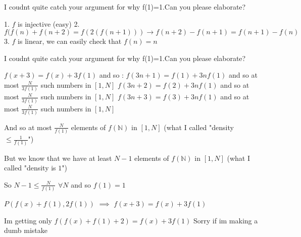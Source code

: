 \begin{solution}
	I coudnt quite catch your argument for why f(1)=1.Can you please elaborate?
\end{solution}



\begin{solution}
	1. $f$ is injective (easy)
2. $f(f(n)+f(n+2)=f(2(f(n+1))) \rightarrow f(n+2)-f(n+1)=f(n+1)-f(n)$
3. $f$ is linear, we can easily check that $f(n)=n$
\end{solution}



\begin{solution}
	\begin{tcolorbox}I coudnt quite catch your argument for why f(1)=1.Can you please elaborate?\end{tcolorbox}
$f(x+3)=f(x)+3f(1)$ and so :
$f(3n+1)=f(1)+3nf(1)$ and so at most $\frac N{3f(1)}$ such numbers in $[1,N]$
$f(3n+2)=f(2)+3nf(1)$ and so at most $\frac N{3f(1)}$ such numbers in $[1,N]$
$f(3n+3)=f(3)+3nf(1)$ and so at most $\frac N{3f(1)}$ such numbers in $[1,N]$

And so at most $\frac N{f(1)}$ elements of $f(\mathbb N)$ in $[1,N]$ (what I called "density $\le \frac 1{f(1)}$")

But we know that we have at least $N-1$ elements of $f(\mathbb N)$ in $[1,N]$ (what I called "density is $1$")

So $N-1\le \frac N{f(1)}$ $\forall N$ and so $f(1)=1$
\end{solution}



\begin{solution}
	\begin{tcolorbox}
$P(f(x)+f(1),2f(1))$ $\implies$ $f(x+3)=f(x)+3f(1)$
\end{tcolorbox}
Im getting only  $f(f(x)+f(1)+2)=f(x)+3f(1)$
Sorry if im making a dumb mistake
\end{solution}






